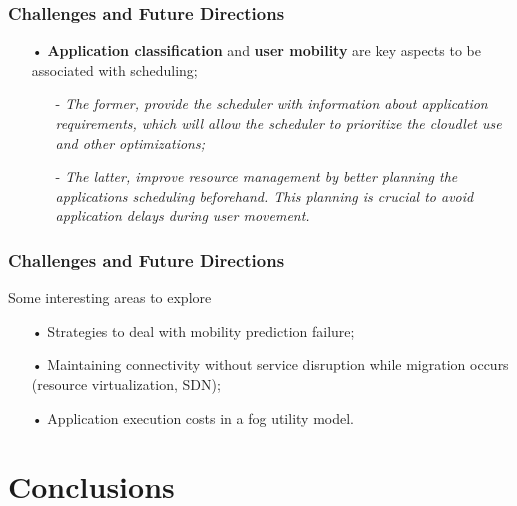 \documentclass[10pt, pdf, xcolor=pdftex, dvipsnames, table]{beamer}
\begin{document}
\begin{frame}
	\frametitle{Challenges and Future Directions}
 	\begin{block}{}
 		\begin{itemize}
 			\item[•] \textbf{Application classification} and \textbf{user mobility} are key aspects to be associated with scheduling;\newline
 			\begin{itemize}
 				\item[-] \footnotesize\textit{The former, provide the scheduler with information about application requirements, which will allow the scheduler to prioritize the cloudlet use and other optimizations;}\newline
 		    	\item[-] \footnotesize\textit{The latter, improve resource management by better planning the applications scheduling beforehand. This planning is crucial to avoid application delays during user movement.}
 			\end{itemize}
 		\end{itemize}
 	\end{block}
\end{frame}

\begin{frame}
	\frametitle{Challenges and Future Directions}
 	\begin{block}{Some interesting areas to explore}
 		\begin{itemize}
 			\item[•] Strategies to deal with mobility prediction failure;\newline
 			\item[•] Maintaining connectivity without service disruption while migration occurs (resource virtualization, SDN);\newline
 			\item[•] Application execution costs in a fog utility model.
 		\end{itemize}
 	\end{block}
\end{frame}

\section[Conclusions]{Conclusions}

\begin{frame}
	\tableofcontents[currentsection]
\end{frame}
\end{document}
